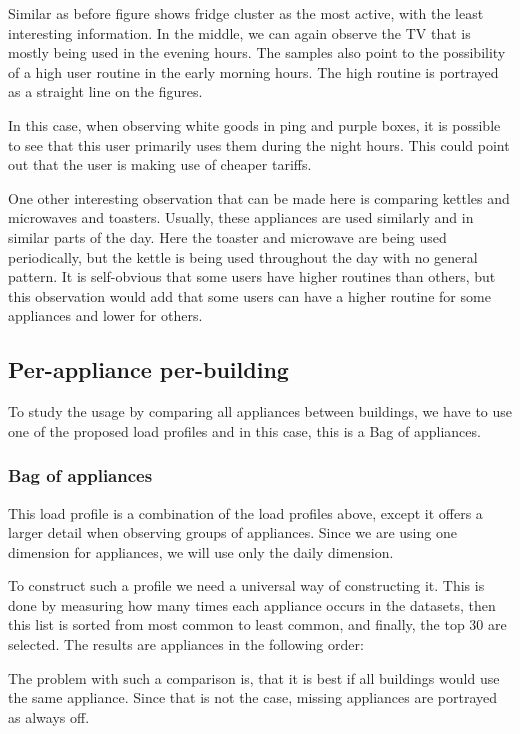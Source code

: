 Similar as before figure \label{fig:tsne_papb_img_scatter_ent_refit8} shows fridge cluster as the most active,
with the least interesting information. In the middle, we can again observe the TV that is mostly being used
in the evening hours. The samples also point to the possibility of a high user routine in the early morning hours.
The high routine is portrayed as a straight line on the figures. 

In this case, when observing white goods in ping and purple boxes, it is possible to see that this user primarily uses them during the night hours.
This could point out that the user is making use of cheaper tariffs.

One other interesting observation that can be made here is comparing kettles and microwaves and toasters.
Usually, these appliances are used similarly and in similar parts of the day. 
Here the toaster and microwave are being used periodically, but the kettle is being used throughout the day with no general pattern.
It is self-obvious that some users have higher routines than others, but this observation
would add that some users can have a higher routine for some appliances and lower for others. 

\subsection{Per-appliance per-building}

To study the usage by comparing all appliances between buildings,
we have to use one of the proposed load profiles and in this case, this is a Bag of appliances.

\subsubsection{Bag of appliances}
This load profile is a combination of the load profiles above,
except it offers a larger detail when observing groups of appliances.
Since we are using one dimension for appliances, we will use only the daily dimension.

To construct such a profile we need a universal way of constructing it.
This is done by measuring how many times each appliance occurs in the datasets,
then this list is sorted from most common to least common, and finally, the top 30 are selected.
The results are appliances in the following order:

The problem with such a comparison is, that it is best 
if all buildings would use the same appliance.
Since that is not the case, missing appliances are portrayed as always off. 

